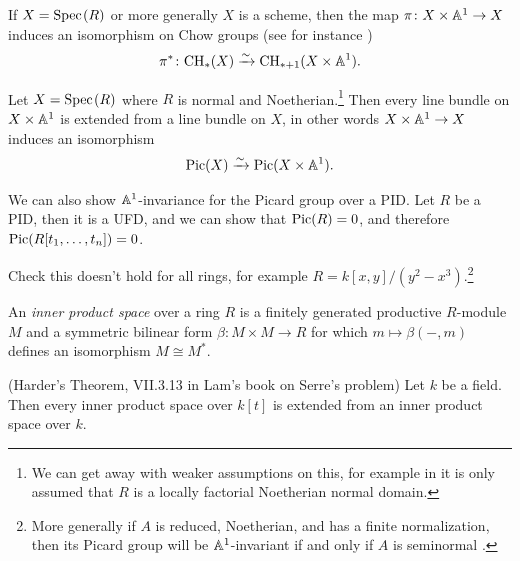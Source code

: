\documentclass[11pt,openany]{book}
\begin{document}
\begin{example} If $X = \text{Spec}\hspace{0.1em}(R)$ or more generally $X$ is a scheme, then the map $\pi \colon X \times \mathbb{A}^1 \to X$ induces an isomorphism on Chow groups (see for instance \cite[3.3]{Fulton})
\begin{align*}
    \pi^\ast \colon \mathrm{CH}_\ast(X) \xrightarrow{\sim} \mathrm{CH}_{\ast+1}(X \times \mathbb{A}^1).
\end{align*}
\end{example}

\begin{example} Let $X = \text{Spec}\hspace{0.1em}(R)$ where $R$ is normal and Noetherian.\footnote{%
We can get away with weaker assumptions on this, for example in \cite[3.7.13]{Asok-A1AG} it is only assumed that $R$ is a locally factorial Noetherian normal domain.
}
Then every line bundle on $X \times \mathbb{A}^1$ is extended from a line bundle on $X$, in other words $X \times \mathbb{A}^1 \to X$ induces an isomorphism
\begin{align*}
    \mathrm{Pic}(X) \xrightarrow{\sim} \mathrm{Pic}(X \times\mathbb{A}^1).
\end{align*}
\end{example}

\begin{example} We can also show $\mathbb{A}^1$-invariance for the Picard group over a PID. Let $R$ be a PID, then it is a UFD, and we can show that $\mathrm{Pic}(R) = 0$, and therefore $\mathrm{Pic}(R[t_1, \ldots, t_n])=0$.
\end{example}




\begin{example} \cite[3.7.1.5]{Asok-A1AG}
Check this doesn't hold for all rings, for example $R = k[x,y]/(y^2-x^3)$.\footnote{%
More generally if $A$ is reduced, Noetherian, and has a finite normalization, then its Picard group will be $\mathbb{A}^1$-invariant if and only if $A$ is seminormal \cite[3.6]{Traverso}.
}
\end{example}

\begin{definition} An \textit{inner product space} over a ring $R$ is a finitely generated productive $R$-module $M$ and a symmetric bilinear form $\beta \colon M \times M \to R$ for which $m \mapsto \beta(-,m)$ defines an isomorphism $M \cong M^\ast$.
\end{definition}


\begin{theorem} (Harder's Theorem, VII.3.13 in Lam's book on Serre's problem) Let $k$ be a field. Then every inner product space over $k[t]$ is extended from an inner product space over $k$.
\end{theorem}
\end{document}
